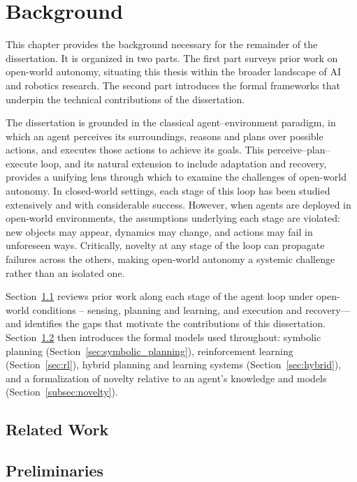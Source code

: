 \chapter{Background}

This chapter provides the background necessary for the remainder of the dissertation. It is organized in two parts. The first part surveys prior work on open-world autonomy, situating this thesis within the broader landscape of AI and robotics research. The second part introduces the formal frameworks that underpin the technical contributions of the dissertation.

The dissertation is grounded in the classical agent--environment paradigm, in which an agent perceives its surroundings, reasons and plans over possible actions, and executes those actions to achieve its goals. This perceive--plan--execute loop, and its natural extension to include adaptation and recovery, provides a unifying lens through which to examine the challenges of open-world autonomy. In closed-world settings, each stage of this loop has been studied extensively and with considerable success. However, when agents are deployed in open-world environments, the assumptions underlying each stage are violated: new objects may appear, dynamics may change, and actions may fail in unforeseen ways. Critically, novelty at any stage of the loop can propagate failures across the others, making open-world autonomy a systemic challenge rather than an isolated one.

Section~\ref{sec:related_work} reviews prior work along each stage of the agent loop under open-world conditions -- sensing, planning and learning, and execution and recovery---and identifies the gaps that motivate the contributions of this dissertation. Section~\ref{sec:preliminaries} then introduces the formal models used throughout: symbolic planning (Section~\ref{sec:symbolic_planning}), reinforcement learning (Section~\ref{sec:rl}), hybrid planning and learning systems (Section~\ref{sec:hybrid}), and a formalization of novelty relative to an agent's knowledge and models (Section~\ref{subsec:novelty}).

\section{Related Work}
\label{sec:related_work}



\section{Preliminaries}
\label{sec:preliminaries}

